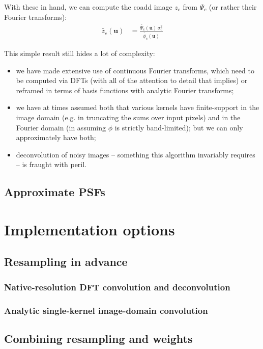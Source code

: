 \documentclass[DM,authoryear,toc]{lsstdoc}
\begin{document}
With these in hand, we can compute the coadd image $z_c$ from $\Psi_c$ (or rather their Fourier transforms):
\begin{align}
    \widetilde{z_c}(\symbf{u}) &= \frac{\widetilde{\Psi_c}(\symbf{u}) \, \sigma_c^2}{\widetilde{\phi_c}(\symbf{u})}
\end{align}

This simple result still hides a lot of complexity:
\begin{itemize}
    \item we have made extensive use of continuous Fourier transforms, which need to be computed via DFTs (with all of the attention to detail that implies) or reframed in terms of basis functions with analytic Fourier transforms;
    \item we have at times assumed both that various kernels have finite-support in the image domain (e.g. in truncating the sums over input pixels) and in the Fourier domain (in assuming $\phi$ is strictly band-limited); but we can only approximately have both;
    \item deconvolution of noisy images -- something this algorithm invariably requires -- is fraught with peril.
\end{itemize}

\subsection{Approximate PSFs}

\section{Implementation options}

\subsection{Resampling in advance}

\subsubsection{Native-resolution DFT convolution and deconvolution}

\subsubsection{Analytic single-kernel image-domain convolution}

\subsection{Combining resampling and weights}
\end{document}
